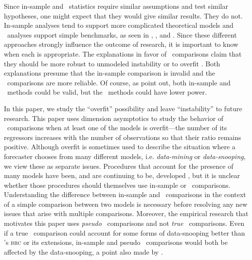 \documentclass[11pt]{article}
\newcommand{\citepos}[1]{\citeauthor{#1}'s \citeyearpar{#1}}
\begin{document}
Since in-sample and \oos\ statistics require similar assumptions and
test similar hypotheses, one might expect that they would give similar
results.  They do not.  In-sample analyses tend to support more
complicated theoretical models and \oos\ analyses support simple
benchmarks, as seen in \citet{MeR:83}, \citet{StW:03}, and
\citet{GoW:08}.  Since these different approaches strongly influence
the outcome of research, it is important to know when each is
appropriate.  The explanations in favor of \oos\ comparisons claim
that they should be more robust to unmodeled instability
\citep{ClM:05,GiW:06,GiR:09,GiR:10} or to overfit
\citep{Mcc:98,Cla:04}.  Both explanations presume that the in-sample
comparison is invalid and the \oos\ comparisons are more reliable.  Of
course, as \citet{InK:04,InK:06} point out, both in-sample and \oos\
methods could be valid, but the \oos\ methods could have lower power.

In this paper, we study the ``overfit'' possibility and leave
``instability'' to future research. This paper uses dimension
asymptotics to study the behavior of \oos\ comparisons when at least
one of the models is overfit---the number of its regressors
increases with the number of observations so that their ratio remains
positive.  Although overfit is sometimes used to describe the
situation where a forecaster chooses from many different models,
i.e. \textit{data-mining} or \textit{data-snooping}, we view these as
separate issues.  Procedures that account for the presence of many
models have been, and are continuing to be, developed \citep[see, for
example,][]{Whi:00,Han:05,RoW:05,HHK:10,ClM:12b}, but it is unclear
whether those procedures should themselves use in-sample or \oos\
comparisons.  Understanding the difference between in-sample and \oos\
comparisons in the context of a simple comparison between two models
is necessary before resolving any new issues that arise with multiple
comparisons. Moreover, the empirical research that motivates
this paper uses \textit{pseudo} \oos\ comparisons and not
\textit{true} \oos\ comparisons.  Even if a true \oos\ comparison
could account for some forms of data-snooping better than
\citepos{Whi:00} \textsc{brc} or its extensions, in-sample and pseudo
\oos\ comparisons would both be affected by the data-snooping, a
point also made by \citet{InK:04}.
\end{document}
